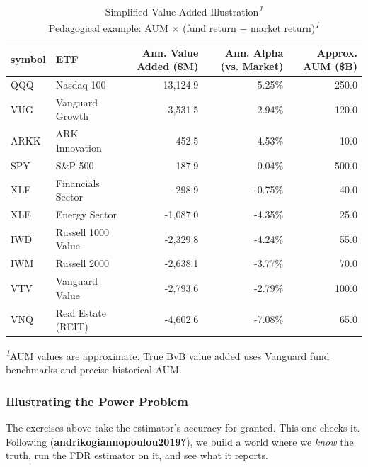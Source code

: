 \documentclass[
  letterpaper,
  DIV=11,
  numbers=noendperiod]{scrartcl}
\begin{document}
\begin{table}
\caption*{
{\fontsize{20}{25}\selectfont  Simplified Value-Added Illustration\textsuperscript{\textit{1}}\fontsize{12}{15}\selectfont } \\ 
{\fontsize{14}{17}\selectfont  Pedagogical example: AUM × (fund return − market return)\textsuperscript{\textit{1}}\fontsize{12}{15}\selectfont }
} 
\fontsize{12.0pt}{14.0pt}\selectfont
\begin{tabular*}{\linewidth}{@{\extracolsep{\fill}}llrrr}
\toprule
symbol & ETF & Ann. Value Added (\$M) & Ann. Alpha (vs. Market) & Approx. AUM (\$B) \\ 
\midrule\addlinespace[2.5pt]
QQQ & Nasdaq-100 & 13,124.9 & 5.25\% & 250.0 \\ 
VUG & Vanguard Growth & 3,531.5 & 2.94\% & 120.0 \\ 
ARKK & ARK Innovation & 452.5 & 4.53\% & 10.0 \\ 
SPY & S\&P 500 & 187.9 & 0.04\% & 500.0 \\ 
XLF & Financials Sector & -298.9 & -0.75\% & 40.0 \\ 
XLE & Energy Sector & -1,087.0 & -4.35\% & 25.0 \\ 
IWD & Russell 1000 Value & -2,329.8 & -4.24\% & 55.0 \\ 
IWM & Russell 2000 & -2,638.1 & -3.77\% & 70.0 \\ 
VTV & Vanguard Value & -2,793.6 & -2.79\% & 100.0 \\ 
VNQ & Real Estate (REIT) & -4,602.6 & -7.08\% & 65.0 \\ 
\bottomrule
\end{tabular*}
\begin{minipage}{\linewidth}
\vspace{.05em}
\textsuperscript{\textit{1}}AUM values are approximate. True BvB value added uses Vanguard fund benchmarks and precise historical AUM.\\
\end{minipage}
\end{table}

\subsubsection{Illustrating the Power
Problem}\label{illustrating-the-power-problem}

The exercises above take the estimator's accuracy for granted. This one
checks it. Following (\textbf{andrikogiannopoulou2019?}), we build a
world where we \emph{know} the truth, run the FDR estimator on it, and
see what it reports.
\end{document}
